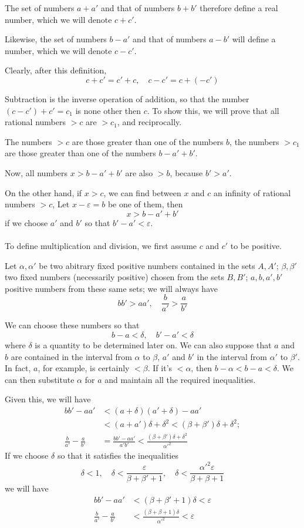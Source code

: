 \documentclass[10pt,letterpaper]{book}
\renewcommand\epsilon{\varepsilon}
\theoremstyle{definition}
\begin{document}
The set of numbers $a+a'$ and that of numbers $b+b'$ therefore define a real number, which we will denote $c+c'$.

Likewise, the set of numbers $b-a'$ and that of numbers $a-b'$ will define a number, which we will denote $c-c'$.

Clearly, after this definition,
\[
  c + c' = c' + c,\quad c-c'=c+(-c')
\]

Subtraction is the inverse operation of addition, so that the number $(c-c')+c'=c_1$ is none other then $c$. To show this, we will prove that all rational numbers $>c$ are $>c_1$, and reciprocally.

The numbers $> c$ are those greater than one of the numbers $b$, the numbers $> c_1$ are those greater than one of the numbers $b-a'+b'$.

Now, all numbers $x>b-a'+b'$ are also $>b$, because $b'> a'$.

On the other hand, if $x > c$, we can find between $x$ and $c$  an infinity of rational numbers $> c$, Let $x-\epsilon = b$ be one of them, then
\[
  x > b-a'+b'
\]
if we choose $a'$ and $b'$ so that $b'-a'< \epsilon$.

\paragraph{} To define multiplication and division, we first assume $c$ and $c'$ to be positive.

Let $\alpha, \alpha'$ be two abitrary fixed positive numbers contained in the sets $A, A'$; $\beta, \beta'$ two fixed numbers (necessarily positive) chosen from the sets $B, B'$; $a, b, a', b'$ positive numbers from these same sets; we will always have
\[
  bb' > aa',\quad \frac b {a'} > \frac a {b'}
\]


We can choose these numbers so that
\[
  b-a < \delta,\quad b'-a' < \delta
\]
where $\delta$ is a quantity to be determined later on.
We can also suppose that $a$ and $b$ are contained in the interval from $\alpha$ to $\beta$, $a'$ and $b'$ in the interval from $\alpha'$ to $\beta'$. In fact, $a$, for example, is certainly $<\beta$. If it's $<\alpha$, then $b-\alpha < b-a < \delta$. We can then substitute $\alpha$ for $a$ and maintain all the required inequalities.

Given this, we will have
\begin{align*}
  bb'-aa' &< (a+\delta)(a'+\delta) - aa'\\
    &<(a+a')\delta + \delta^2 < (\beta+\beta')\delta + \delta^2;\\
 \frac{b}{a'} - \frac{a}{b'} &= \frac{bb'-aa'}{a'b'} < 
   \frac{(\beta + \beta')\delta + \delta^2}{\alpha'^2}    
\end{align*}
If we choose $\delta$ so that it satisfies the inequalities
\[
  \delta < 1,\quad 
  \delta < \frac{\epsilon}{\beta+\beta'+1},\quad
  \delta < \frac{\alpha'^2\epsilon}{\beta+\beta+1}
\]
we will have
\begin{align*}
  bb'-aa'&<(\beta + \beta' + 1)\delta < \epsilon\\
  \frac{b}{a'}-\frac{a}{b'}&<
  \frac{(\beta+\beta+1)\delta}{\alpha'^2} < \epsilon
\end{align*}
\end{document}
